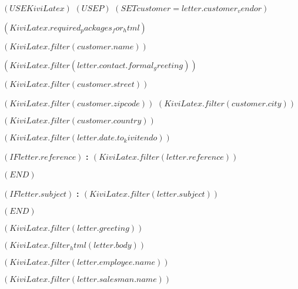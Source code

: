 $( USE KiviLatex )$
$( USE P )$
$( SET customer = letter.customer_vendor )$

$( KiviLatex.required_packages_for_html )$

\newcommand{\lxlangcode}{$(template_meta.language.template_code)$}
\newcommand{\lxmedia}{$(template_meta.media)$}
\newcommand{\lxcurrency}{}
\newcommand{\kivicompany}{$(employee_company)$}



\ourhead{}{}{}{}{}



\fontsize{10pt}{12pt}\selectfont

\vspace*{1cm}

\begin{minipage}{14cm}

  $( KiviLatex.filter(customer.name) )$

  $( KiviLatex.filter(letter.contact.formal_greeting) )$

  $( KiviLatex.filter(customer.street) )$

  $( KiviLatex.filter(customer.zipcode) )$ $( KiviLatex.filter(customer.city) )$

  $( KiviLatex.filter(customer.country) )$

\end{minipage}

\vspace{2.5cm}
\hfill $( KiviLatex.filter(letter.date.to_kivitendo) )$

$( IF letter.reference )$
\textbf{\ihrzeichen : $( KiviLatex.filter(letter.reference) )$}

\vspace{1cm}
$( END )$

$( IF letter.subject )$
\textbf{\betreff : $( KiviLatex.filter(letter.subject) )$}

\vspace{1cm}
$( END )$

$( KiviLatex.filter(letter.greeting) )$

\vspace{0.5cm}

$( KiviLatex.filter_html(letter.body) )$

\vspace{0.5cm}

\begin{minipage}{6cm}

\textbf{$( KiviLatex.filter(letter.employee.name) )$}

\end{minipage}
\begin{minipage}{6cm}

\textbf{$( KiviLatex.filter(letter.salesman.name) )$}

\end{minipage}


